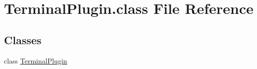 \hypertarget{TerminalPlugin_8class}{\section{Terminal\-Plugin.\-class File Reference}
\label{TerminalPlugin_8class}
}
\subsection*{Classes}
\begin{DoxyCompactItemize}
\item 
class \hyperlink{classTerminalPlugin}{Terminal\-Plugin}
\end{DoxyCompactItemize}
